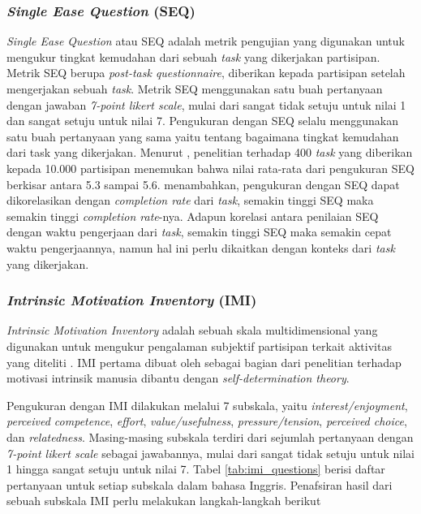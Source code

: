\subsubsection{\textit{Single Ease Question} (SEQ)}
\label{subsubsec:seq}
\textit{Single Ease Question} atau SEQ adalah metrik pengujian yang digunakan untuk mengukur tingkat kemudahan dari sebuah \textit{task} yang dikerjakan partisipan. Metrik SEQ berupa \textit{post-task questionnaire}, diberikan kepada partisipan setelah mengerjakan sebuah \textit{task}. Metrik SEQ menggunakan satu buah pertanyaan dengan jawaban \textit{7-point likert scale}, mulai dari sangat tidak setuju untuk nilai 1 dan sangat setuju untuk nilai 7. Pengukuran dengan SEQ selalu menggunakan satu buah pertanyaan yang sama yaitu tentang bagaimana tingkat kemudahan dari task yang dikerjakan. Menurut \textcite{seq2012sauro}, penelitian terhadap 400 \textit{task} yang diberikan kepada 10.000 partisipan menemukan bahwa nilai rata-rata dari pengukuran SEQ berkisar antara 5.3 sampai 5.6. \textcite{seq2018sauro} menambahkan, pengukuran dengan SEQ dapat dikorelasikan dengan \textit{completion rate} dari \textit{task}, semakin tinggi SEQ maka semakin tinggi \textit{completion rate}-nya. Adapun korelasi antara penilaian SEQ dengan waktu pengerjaan dari \textit{task}, semakin tinggi SEQ maka semakin cepat waktu pengerjaannya, namun hal ini perlu dikaitkan dengan konteks dari \textit{task} yang dikerjakan.

\subsubsection{\textit{Intrinsic Motivation Inventory} (IMI)}
\label{subsubsec:imi}
\textit{Intrinsic Motivation Inventory} adalah sebuah skala multidimensional yang digunakan untuk mengukur pengalaman subjektif partisipan terkait aktivitas yang diteliti \parencite{imisdtorg}. IMI pertama dibuat oleh \textcite{RYANDECI2000SDT} sebagai bagian dari penelitian terhadap motivasi intrinsik manusia dibantu dengan \textit{self-determination theory}.

Pengukuran dengan IMI dilakukan melalui 7 subskala, yaitu \textit{interest/enjoyment}, \textit{perceived competence}, \textit{effort}, \textit{value/usefulness}, \textit{pressure/tension}, \textit{perceived choice}, dan \textit{relatedness}. Masing-masing subskala terdiri dari sejumlah pertanyaan dengan \textit{7-point likert scale} sebagai jawabannya, mulai dari sangat tidak setuju untuk nilai 1 hingga sangat setuju untuk nilai 7. Tabel \ref{tab:imi_questions} berisi daftar pertanyaan untuk setiap subskala dalam bahasa Inggris. Penafsiran hasil dari sebuah subskala IMI perlu melakukan langkah-langkah berikut

